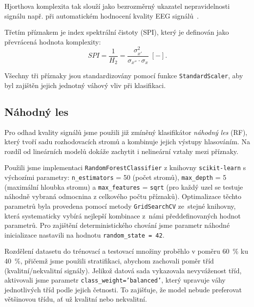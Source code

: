 Hjorthova komplexita tak slouží jako bezrozměrný ukazatel nepravidelnosti signálu např. při automatickém hodnocení kvality EEG signálů~\cite{Geetika2022}.

Třetím příznakem je index spektrální čistoty (\acs{SPI}), který je definován jako převrácená hodnota komplexity:
\begin{equation}
	\label{eq:hjorth_SPI}
	SPI = \frac{1}{H_2} = \frac{\sigma_{x'}^2}{\sigma_{x''} \cdot \sigma_{x}} \; [-].
\end{equation}

Všechny tři příznaky jsou standardizovány pomocí funkce \texttt{StandardScaler}, aby byl zajištěn jejich jednotný váhový vliv při klasifikaci.

\subsection*{Náhodný les}
\label{subsec:random_forest}
Pro odhad kvality signálů jsme použili již zmíněný klasifikátor \emph{náhodný les} (\acs{RF}), který tvoří sadu rozhodovacích stromů a kombinuje jejich výstupy hlasováním.
Na rozdíl od lineárních modelů dokáže zachytit i nelineární vztahy mezi příznaky.

Použili jsme implementaci \texttt{RandomForestClassifier} z knihovny \texttt{scikit-learn} s výchozími parametry: \texttt{n\_estimators} = 50 (počet stromů), \texttt{max\_depth} = 5 (maximální hloubka stromu) a \texttt{max\_features} = \texttt{sqrt} (pro každý uzel se testuje náhodně vybraná odmocnina z celkového počtu příznaků).
Optimalizace těchto parametrů byla provedena pomocí metody \texttt{GridSearchCV} ze~stejné knihovny, která systematicky vybírá nejlepší kombinace z~námi předdefinovaných hodnot parametrů.
Pro zajištění deterministického chování jsme parametr náhodné inicializace nastavili na hodnotu \texttt{random\_state = 42}.

Rozdělení datasetu do trénovací a testovací množiny proběhlo v poměru 60~\% ku 40~\%, přičemž jsme použili stratifikaci, abychom zachovali poměr tříd (kvalitní/nekvalitní signály).
Jelikož datová sada vykazovala nevyváženost tříd, aktivovali jsme parametr \texttt{class\_weight='balanced'}, který upravuje váhy jednotlivých tříd podle jejich četnosti.
To zajišťuje, že model nebude preferovat většinovou třídu, ať už kvalitní nebo nekvalitní.

